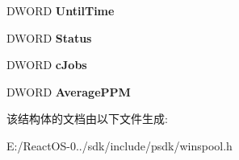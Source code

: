 \begin{DoxyCompactItemize}
D\+W\+O\+RD {\bfseries Until\+Time}
\item 
\mbox{\label{struct___p_r_i_n_t_e_r___i_n_f_o__2_a_a7935633a20cf9eece5b7fb059025c056}} 
D\+W\+O\+RD {\bfseries Status}
\item 
\mbox{\label{struct___p_r_i_n_t_e_r___i_n_f_o__2_a_ae4c0066978876b2a7a0b0e45b3e3e3bc}} 
D\+W\+O\+RD {\bfseries c\+Jobs}
\item 
\mbox{\label{struct___p_r_i_n_t_e_r___i_n_f_o__2_a_aa440de1b3485532b4ae4f1a1506516fd}} 
D\+W\+O\+RD {\bfseries Average\+P\+PM}
\end{DoxyCompactItemize}


该结构体的文档由以下文件生成\+:\begin{DoxyCompactItemize}
\item 
E\+:/\+React\+O\+S-\/0../sdk/include/psdk/winspool.\+h\end{DoxyCompactItemize}
